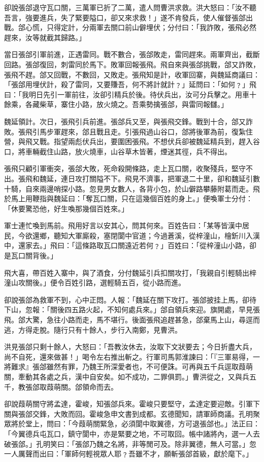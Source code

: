 卻說張郃退守瓦口關，三萬軍已折了二萬，遣人問曹洪求救。洪大怒曰：「汝不聽吾言，強要進兵，失了緊要隘口，卻又來求救！」遂不肯發兵，使人催督張郃出戰。郃心慌，只得定計，分兩軍去關口前山僻埋伏；分付曰：「我詐敗，張飛必然趕來，汝等就截其歸路。」

當日張郃引軍前進，正遇雷同。戰不數合，張郃敗走，雷同趕來。兩軍齊出，截斷回路。張郃復回，刺雷同於馬下。敗軍回報張飛。飛自來與張郃挑戰，郃又詐敗，張飛不趕。郃又回戰，不數回，又敗走。張飛知是計，收軍回寨，與魏延商議曰：「張郃用埋伏計，殺了雷同，又要賺吾，何不將計就計﹖」延問曰：「如何﹖」飛曰：「我明日先引一軍前往，汝卻引精兵於後。待伏兵出，汝可分兵擊之。用車十餘乘，各藏柴草，寨住小路，放火燒之。吾乘勢擒張郃，與雷同報讎。」

魏延領計。次日，張飛引兵前進。張郃兵又至，與張飛交鋒。戰到十合，郃又詐敗。張飛引馬步軍趕來，郃且戰且走。引張飛過山谷口，郃將後軍為前，復紮住營，與飛又戰。指望兩彪伏兵出，要圍困張飛。不想伏兵卻被魏延精兵到，趕入谷口，將車輛截住山路，放火燒車，山谷草木皆著，煙迷其徑，兵不得出。

張飛只顧引軍衝突，張郃大敗，死命殺開條路，走上瓦口關，收聚殘兵，堅守不出。張飛和魏延，連日攻打關隘不下。飛見不濟事，把軍退二十里，卻和魏延引數十騎，自來兩邊哨探小路。忽見男女數人，各背小包，於山僻路攀藤附葛而走。飛於馬上用鞭指與魏延曰：「奪瓦口關，只在這幾個百姓的身上。」便喚軍士分付：「休要驚恐他，好生喚那幾個百姓來。」

軍士連忙喚到馬前。飛用好言以安其心，問其何來。百姓告曰：「某等皆漢中居民，今欲還鄉，聽知大軍廝殺，塞閉閬中官道；今過蒼溪，從梓潼山，檜釿川入漢中，還家去。」飛曰：「這條路取瓦口關遠近若何﹖」百姓曰：「從梓潼山小路，卻是瓦口關背後。」

飛大喜，帶百姓入寨中，與了酒食，分付魏延引兵扣關攻打，「我親自引輕騎出梓潼山攻關後。」便令百姓引路，選輕騎五百，從小路而進。

卻說張郃為救軍不到，心中正悶。人報：「魏延在關下攻打。張郃披挂上馬，卻待下山，忽報：「關後四五路火起，不知何處兵來。」郃自領兵來迎。旗開處，早見張飛。郃大驚，急往小路而走，馬不堪行。後面張飛追趕甚急，郃棄馬上山，尋逕而逃，方得走脫。隨行只有十餘人，步行入南鄭，見曹洪。

洪見張郃只剩十餘人，大怒曰：「吾教汝休去，汝取下文狀要去；今日折盡大兵，尚不自死，還來做甚！」喝令左右推出斬之。行軍司馬郭淮諫曰：「『三軍易得，一將難求』張郃雖然有罪，乃魏王所深愛者也，不可便誅。可再與五千兵逕取葭萌關，牽動其各處之兵，漢中自安矣。如不成功，二罪俱罰。」曹洪從之，又與兵五千，教張郃取葭萌關。郃領命而去。

卻說葭萌關守將孟達，霍峻，知張郃兵來。霍峻只要堅守，孟達定要迎敵。引軍下關與張郃交鋒，大敗而回。霍峻急申文書到成都。玄德聞知，請軍師商議。孔明聚眾將於堂上，問曰：「今葭萌關緊急，必須閬中取翼德，方可退張郃也。」法正曰：「今翼德兵屯瓦口，鎮守閬中，亦是緊要之地，不可取回。帳中諸將內，選一人去破張郃。」孔明笑曰：「張郃乃魏之名將，非等閒可及。除非翼德，無人可當。」忽一人厲聲而出曰：「軍師何輕視眾人耶﹖吾雖不才，願斬張郃首級，獻於麾下。」

